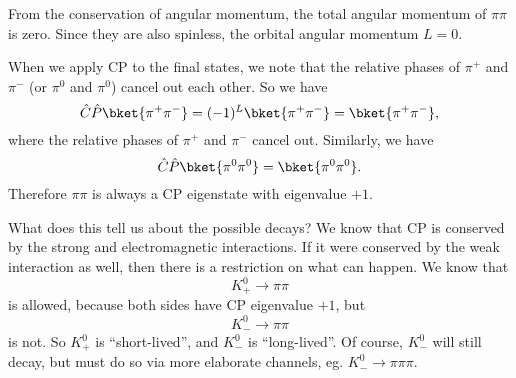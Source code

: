 \documentclass[a4paper]{article}
\begin{document}
\begin{center}
\end{center}
From the conservation of angular momentum, the total angular momentum of $\pi \pi$ is zero. Since they are also spinless, the orbital angular momentum $L = 0$.

When we apply CP to the final states, we note that the relative phases of $\pi^+$ and $\pi^-$ (or $\pi^0$ and $\pi^0$) cancel out each other. So we have
\[
  \hat{C}\hat{P} \bket{\pi^+\pi^-} = (-1)^L \bket{\pi^+\pi^-} = \bket{\pi^+ \pi^-},
\]
where the relative phases of $\pi^+$ and $\pi^-$ cancel out. Similarly, we have
\[
  \hat{C}\hat{P} \bket{\pi^0 \pi^0} = \bket{\pi^0 \pi^0}.
\]
Therefore $\pi \pi$ is always a CP eigenstate with eigenvalue $+1$.

What does this tell us about the possible decays? We know that CP is conserved by the strong and electromagnetic interactions. If it were conserved by the weak interaction as well, then there is a restriction on what can happen. We know that
\[
  K^0_+ \to \pi \pi
\]
is allowed, because both sides have CP eigenvalue $+1$, but
\[
  K^0_- \to \pi \pi
\]
is not. So $K^0_+$ is ``short-lived'', and $K^0_-$ is ``long-lived''. Of course, $K^0_-$ will still decay, but must do so via more elaborate channels, eg. $K^0_- \to \pi \pi \pi$.
\end{document}

